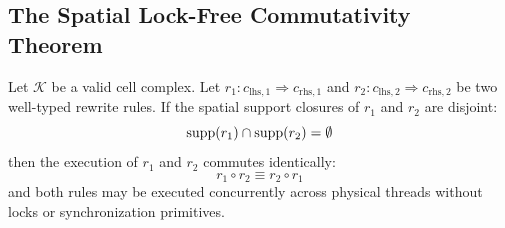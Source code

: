 \subsection{The Spatial Lock-Free Commutativity Theorem}
\begin{theorem}
\label{thm:spatial_commutativity}
Let $\mathcal{K}$ be a valid cell complex. Let $r_1 : c_{\text{lhs},1} \Rightarrow c_{\text{rhs},1}$ and $r_2 : c_{\text{lhs},2} \Rightarrow c_{\text{rhs},2}$ be two well-typed rewrite rules. If the spatial support closures of $r_1$ and $r_2$ are disjoint:
\begin{equation}
    \operatorname{supp}(r_1) \cap \operatorname{supp}(r_2) = \emptyset
\end{equation}
then the execution of $r_1$ and $r_2$ commutes identically:
\begin{equation}
    r_1 \circ r_2 \equiv r_2 \circ r_1
\end{equation}
and both rules may be executed concurrently across physical threads without locks or synchronization primitives.
\end{theorem}

